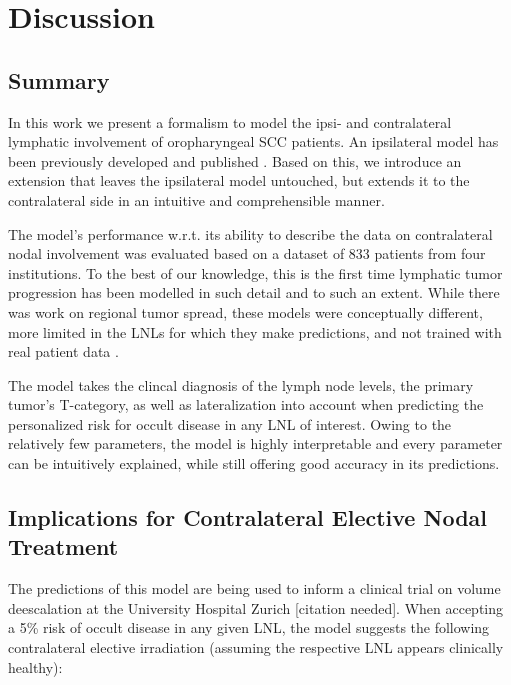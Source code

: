 \documentclass[
  sn-mathphys-num,
]{sn-jnl}
\begin{document}
\section{Discussion}\label{sec-discussion}

\subsection{Summary}\label{summary}

In this work we present a formalism to model the ipsi- and contralateral
lymphatic involvement of oropharyngeal SCC patients. An ipsilateral
model has been previously developed and published
\citep{ludwig_hidden_2021, ludwig_modelling_2023}. Based on this, we
introduce an extension that leaves the ipsilateral model untouched, but
extends it to the contralateral side in an intuitive and comprehensible
manner.

The model's performance w.r.t. its ability to describe the data on
contralateral nodal involvement was evaluated based on a dataset of 833
patients from four institutions. To the best of our knowledge, this is
the first time lymphatic tumor progression has been modelled in such
detail and to such an extent. While there was work on regional tumor
spread, these models were conceptually different, more limited in the
LNLs for which they make predictions, and not trained with real patient
data \citep{benson_markov_2006, jung_development_2017}.

The model takes the clincal diagnosis of the lymph node levels, the
primary tumor's T-category, as well as lateralization into account when
predicting the personalized risk for occult disease in any LNL of
interest. Owing to the relatively few parameters, the model is highly
interpretable and every parameter can be intuitively explained, while
still offering good accuracy in its predictions.

\subsection{Implications for Contralateral Elective Nodal
Treatment}\label{implications-for-contralateral-elective-nodal-treatment}

The predictions of this model are being used to inform a clinical trial
on volume deescalation at the University Hospital Zurich {[}citation
needed{]}. When accepting a 5\% risk of occult disease in any given LNL,
the model suggests the following contralateral elective irradiation
(assuming the respective LNL appears clinically healthy):
\end{document}
